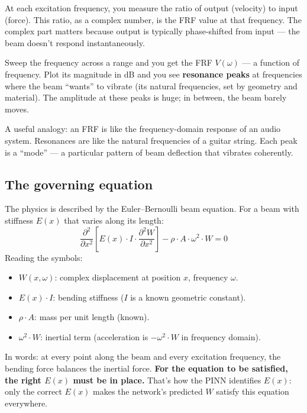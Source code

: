 \documentclass[11pt,a4paper]{article}
\begin{document}
At each excitation frequency, you measure the ratio of output (velocity) to input (force). This ratio, as a complex number, is the FRF value at that frequency. The complex part matters because output is typically phase-shifted from input --- the beam doesn't respond instantaneously.

Sweep the frequency across a range and you get the FRF $V(\omega)$ --- a function of frequency. Plot its magnitude in dB and you see \textbf{resonance peaks} at frequencies where the beam ``wants'' to vibrate (its natural frequencies, set by geometry and material). The amplitude at these peaks is huge; in between, the beam barely moves.

A useful analogy: an FRF is like the frequency-domain response of an audio system. Resonances are like the natural frequencies of a guitar string. Each peak is a ``mode'' --- a particular pattern of beam deflection that vibrates coherently.

\subsection{The governing equation}

The physics is described by the Euler--Bernoulli beam equation. For a beam with stiffness $E(x)$ that varies along its length:
\begin{equation}
\frac{\partial^2}{\partial x^2}\!\left[E(x) \cdot I \cdot \frac{\partial^2 W}{\partial x^2}\right] - \rho \cdot A \cdot \omega^2 \cdot W = 0
\label{eq:pde}
\end{equation}
Reading the symbols:
\begin{itemize}[leftmargin=*, itemsep=2pt]
\item $W(x, \omega)$: complex displacement at position $x$, frequency $\omega$.
\item $E(x) \cdot I$: bending stiffness ($I$ is a known geometric constant).
\item $\rho \cdot A$: mass per unit length (known).
\item $\omega^2 \cdot W$: inertial term (acceleration is $-\omega^2 \cdot W$ in frequency domain).
\end{itemize}

In words: at every point along the beam and every excitation frequency, the bending force balances the inertial force. \textbf{For the equation to be satisfied, the right $E(x)$ must be in place.} That's how the PINN identifies $E(x)$: only the correct $E(x)$ makes the network's predicted $W$ satisfy this equation everywhere.
\end{document}
